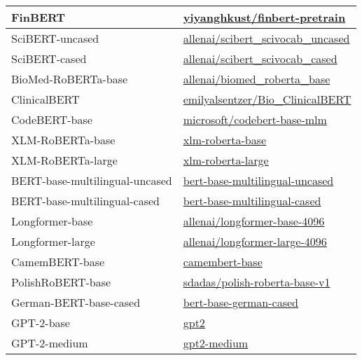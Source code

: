 \begin{longtable}{| l | l |}
    \hline
    FinBERT & \href{https://huggingface.co/yiyanghkust/finbert-pretrain}{yiyanghkust/finbert-pretrain} \\
    \hline
    SciBERT-uncased & \href{https://huggingface.co/allenai/scibert_scivocab_uncased}{allenai/scibert\_scivocab\_uncased} \\
    \hline
    SciBERT-cased & \href{https://huggingface.co/allenai/scibert_scivocab_cased}{allenai/scibert\_scivocab\_cased} \\
    \hline
    BioMed-RoBERTa-base & \href{https://huggingface.co/allenai/biomed_roberta_base}{allenai/biomed\_roberta\_base} \\
    \hline
    ClinicalBERT & \href{https://huggingface.co/emilyalsentzer/Bio_ClinicalBERT}{emilyalsentzer/Bio\_ClinicalBERT} \\
    \hline
    CodeBERT-base & \href{https://huggingface.co/microsoft/codebert-base-mlm}{microsoft/codebert-base-mlm} \\
    \hline
    XLM-RoBERTa-base & \href{https://huggingface.co/xlm-roberta-base}{xlm-roberta-base} \\
    \hline
    XLM-RoBERTa-large & \href{https://huggingface.co/xlm-roberta-large}{xlm-roberta-large} \\
    \hline
    BERT-base-multilingual-uncased & \href{https://huggingface.co/bert-base-multilingual-uncased}{bert-base-multilingual-uncased} \\
    \hline
    BERT-base-multilingual-cased & \href{https://huggingface.co/bert-base-multilingual-cased}{bert-base-multilingual-cased} \\
    \hline
    Longformer-base & \href{https://huggingface.co/allenai/longformer-base-4096}{allenai/longformer-base-4096} \\
    \hline
    Longformer-large & \href{https://huggingface.co/allenai/longformer-large-4096}{allenai/longformer-large-4096} \\
    \hline
    CamemBERT-base & \href{https://huggingface.co/camembert-base}{camembert-base} \\
    \hline
    PolishRoBERT-base & \href{https://huggingface.co/sdadas/polish-roberta-base-v1}{sdadas/polish-roberta-base-v1} \\
    \hline
    German-BERT-base-cased & \href{https://huggingface.co/bert-base-german-cased}{bert-base-german-cased} \\
    \hline
    GPT-2-base & \href{https://huggingface.co/gpt2}{gpt2} \\
    \hline
    GPT-2-medium & \href{https://huggingface.co/gpt2-medium}{gpt2-medium} \\

\end{longtable}
